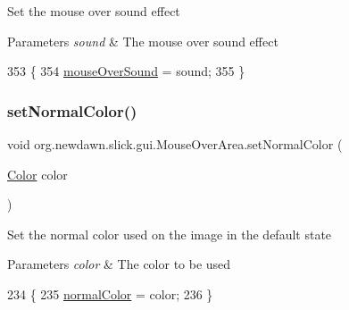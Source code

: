 Set the mouse over sound effect


\begin{DoxyParams}{Parameters}
{\em sound} & The mouse over sound effect \\
\hline
\end{DoxyParams}

\begin{DoxyCode}
353                                                \{
354         \mbox{\hyperlink{classorg_1_1newdawn_1_1slick_1_1gui_1_1_mouse_over_area_a164a8228e96ad3da2c07366a0d93b661}{mouseOverSound}} = sound;
355     \}
\end{DoxyCode}
\mbox{\label{classorg_1_1newdawn_1_1slick_1_1gui_1_1_mouse_over_area_a64c31f0ec3a3b74d9d6f9645f670e7cc}} 
\subsubsection{\texorpdfstring{set\+Normal\+Color()}{setNormalColor()}}
{\footnotesize\ttfamily void org.\+newdawn.\+slick.\+gui.\+Mouse\+Over\+Area.\+set\+Normal\+Color (\begin{DoxyParamCaption}\item[{\mbox{\hyperlink{classorg_1_1newdawn_1_1slick_1_1_color}{Color}}}]{color }\end{DoxyParamCaption})\hspace{0.3cm}{\ttfamily [inline]}}

Set the normal color used on the image in the default state


\begin{DoxyParams}{Parameters}
{\em color} & The color to be used \\
\hline
\end{DoxyParams}

\begin{DoxyCode}
234                                             \{
235         \mbox{\hyperlink{classorg_1_1newdawn_1_1slick_1_1gui_1_1_mouse_over_area_a03087a0e7e292f9c1be2225d3c36db98}{normalColor}} = color;
236     \}
\end{DoxyCode}
\mbox{\label{classorg_1_1newdawn_1_1slick_1_1gui_1_1_mouse_over_area_a2a71a564e81028fefd5c626d27d5494e}} 
